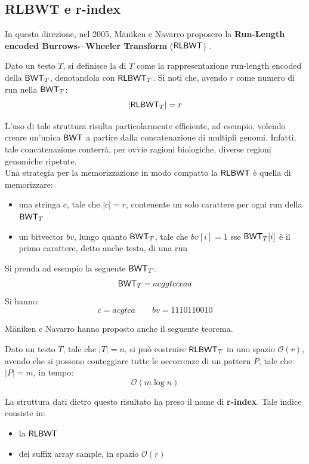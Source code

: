 \subsection{RLBWT e r-index}
In questa direzione, nel 2005, M\"{a}niken e Navarro proposero la
\textbf{Run-Length encoded Burrows-–Wheeler Transform} ($\mbox{\rm {\sf RLBWT}}$)
\cite{rlbwt}.
\begin{definizione}
  Dato un testo $T$, si definisce la \RLBWT di $T$
  come la rappresentazione run-length encoded della $\mbox{\rm {\sf BWT}}_T$,
  denotandola con $\mbox{\rm {\sf RLBWT}}_T$. Si noti che, avendo $r$ come numero di run nella
  $\mbox{\rm {\sf BWT}}_T$: 
  \begin{equation}
    \label{eq:rlbwt1}
    |\mbox{\rm {\sf RLBWT}}_T|=r
  \end{equation}
\end{definizione}
L'uso di tale
struttura risulta particolarmente efficiente, ad esempio, volendo creare
un'unica $\mbox{\rm {\sf BWT}}$ a partire dalla concatenazione di multipli
genomi. Infatti, tale
concatenazione conterrà, per ovvie ragioni biologiche, diverse regioni genomiche
ripetute. \\
Una strategia per la memorizzazione in modo compatto la $\mbox{\rm {\sf RLBWT}}$ è quella
di memorizzare: 
\begin{itemize}
  \item una stringa $c$, tale che $|c|=r$, contenente un solo carattere per ogni
  run della $\mbox{\rm {\sf BWT}}_T$
  \item un bitvector $bv$, lungo quanto $\mbox{\rm {\sf BWT}}_T$, tale che $bv[i]=1$ sse
  $\mbox{\rm {\sf BWT}}_T[i]$ è il primo carattere, detto anche testa, di una run 
\end{itemize}
\begin{esempio}
  Si prenda ad esempio la seguente $\mbox{\rm {\sf BWT}}_T$:
  \[\mbox{\rm {\sf BWT}}_T=acggtcccaa\]
  Si hanno:
  \[c=acgtca\quad \quad bv=1110110010\]
\end{esempio}
M\"{a}niken e Navarro hanno proposto anche il seguente teorema.
\begin{teorema}
  Dato un testo $T$, tale che $|T|=n$, si può costruire $\mbox{\rm {\sf RLBWT}}_T$ in
  uno spazio $\mathcal{O}(r)$, avendo che si possono conteggiare tutte le
  occorrenze di un pattern $P$, tale che $|P|=m$, in tempo:
  \begin{equation}
    \label{eq:rlbwt2}
    \mathcal{O}(m\log n)
  \end{equation}
\end{teorema}
\noindent
La struttura dati dietro questo risultato ha preso il nome di \textbf{r-index}.
Tale indice consiste in: 
\begin{itemize}
  \item la $\mbox{\rm {\sf RLBWT}}$
  \item dei suffix array sample, in spazio $\mathcal{O}(r)$
\end{itemize}
